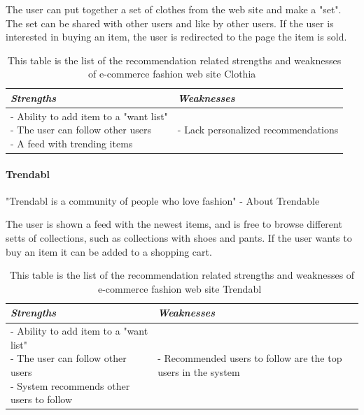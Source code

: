     The user can put together a set of clothes from the web site and make a "set".
    The set can be shared with other users and like by other users.
    If the user is interested in buying an item, the user is redirected to the page the item is sold.
    \begin{table}[H]
        \centering
        \begin{tabular}{l|l}
            \toprule
            \emph{Strengths} & \emph{Weaknesses} \\ \hline
            \pbox{9cm}{
                - Ability to add item to a "want list" \\
                - The user can follow other users \\
                - A feed with trending items
            } & \pbox{9cm}{
                - Lack personalized recommendations \\
            } \\ \bottomrule
        \end{tabular}
        \caption[Recommendation related strengths and weaknesses of Clothia~\cite{clothia}]{This table is the list of the recommendation related strengths and weaknesses of e-commerce fashion web site Clothia~\cite{clothia}}
        \label{table:ecommenreceClothia}
    \end{table}


\paragraph{Trendabl} %
\label{par:trendabl}
    "Trendabl is a community of people who love fashion" - About Trendable~\cite{trendabl}

    The user is shown a feed with the newest items, and is free to browse different setts of collections, such as collections with shoes and pants.
    If the user wants to buy an item it can be added to a shopping cart.
    \begin{table}[H]
        \centering
        \begin{tabular}{l|l}
            \toprule
            \emph{Strengths} & \emph{Weaknesses} \\ \hline
            \pbox{9cm}{
                - Ability to add item to a "want list" \\
                - The user can follow other users \\
                - System recommends other users to follow
            } & \pbox{9cm}{
                - Recommended users to follow are the top users in the system \\
            } \\ \bottomrule
        \end{tabular}
        \caption[Recommendation related strengths and weaknesses of Trendabl~\cite{trendabl}]{This table is the list of the recommendation related strengths and weaknesses of e-commerce fashion web site Trendabl~\cite{trendabl}}
        \label{table:ecommenreceTrendabl}
    \end{table}


